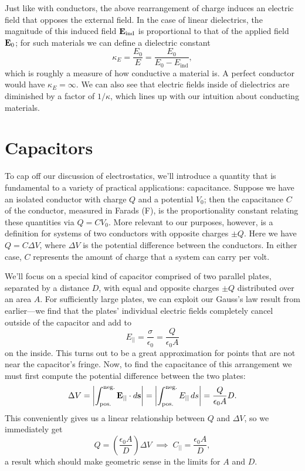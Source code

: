 \documentclass[../p051main.tex]{subfiles}
\begin{document}
Just like with conductors, the above rearrangement of charge induces an electric field that opposes the external field.
In the case of linear dielectrics, the magnitude of this induced field $\mathbf{E}_\textrm{ind}$ is proportional to that of the applied field $\mathbf{E}_0$; for such materials we can define a dielectric constant
\[ \kappa_E = \frac{E_0}{E} = \frac{E_0}{E_0 - E_\textrm{ind}}, \]
which is roughly a measure of how conductive a material is.
A perfect conductor would have $\kappa_E = \infty$.
We can also see that electric fields inside of dielectrics are diminished by a factor of $1 / \kappa$, which lines up with our intuition about conducting materials.

\section{Capacitors}
To cap off our discussion of electrostatics, we'll introduce a quantity that is fundamental to a variety of practical applications: capacitance.
Suppose we have an isolated conductor with charge $Q$ and a potential $V_0$; then the capacitance $C$ of the conductor, measured in Farads (F), is the proportionality constant relating these quantities via $Q = CV_0$.
More relevant to our purposes, however, is a definition for systems of two conductors with opposite charges $\pm Q$.
Here we have $Q = C \Delta V$, where $\Delta V$ is the potential difference between the conductors.
In either case, $C$ represents the amount of charge that a system can carry per volt.

We'll focus on a special kind of capacitor comprised of two parallel plates, separated by a distance $D$, with equal and opposite charges $\pm Q$ distributed over an area $A$.
For sufficiently large plates, we can exploit our Gauss's law result from earlier---we find that the plates' individual electric fields completely cancel outside of the capacitor and add to
\[ E_{||} = \frac{\sigma}{\epsilon_0} = \frac{Q}{\epsilon_0 A} \]
on the inside.
This turns out to be a great approximation for points that are not near the capacitor's fringe.
Now, to find the capacitance of this arrangement we must first compute the potential difference between the two plates:
\[ \Delta V = \left| \int_\textrm{pos.}^\textrm{neg.} \mathbf{E}_{||} \cdot d\mathbf{s} \right| = \left| \int_\textrm{pos.}^\textrm{neg.} E_{||} \,ds \right| = \frac{Q}{\epsilon_0 A}D. \]
This conveniently gives us a linear relationship between $Q$ and $\Delta V$, so we immediately get
\[ Q = \left( \frac{\epsilon_0 A}{D} \right) \Delta V \;\implies\; C_{||} = \frac{\epsilon_0 A}{D}, \]
a result which should make geometric sense in the limits for $A$ and $D$.
\end{document}
